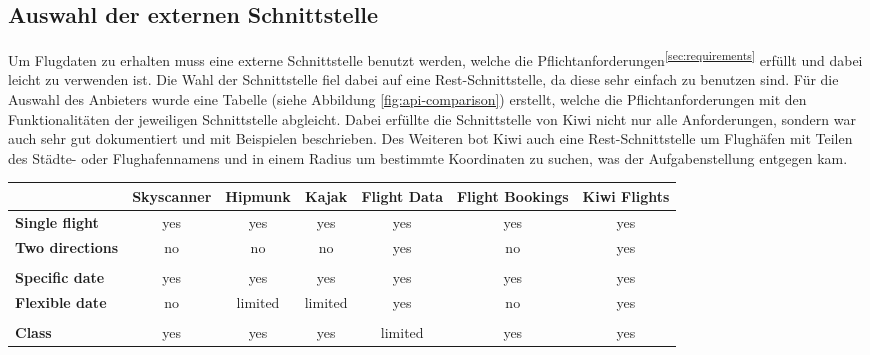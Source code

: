 \documentclass[12pt,twoside,a4paper]{article}
\begin{document}
\begin{sloppypar}
\subsection{Auswahl der externen Schnittstelle}
Um Flugdaten zu erhalten muss eine externe Schnittstelle benutzt werden, welche die Pflichtanforderungen\textsuperscript{\ref{sec:requirements}} erfüllt und dabei leicht zu verwenden ist. Die Wahl der Schnittstelle fiel dabei auf eine Rest-Schnittstelle, da diese sehr einfach zu benutzen sind. Für die Auswahl des Anbieters wurde eine Tabelle (siehe Abbildung \ref{fig:api-comparison}) erstellt, welche die Pflichtanforderungen mit den Funktionalitäten der jeweiligen Schnittstelle abgleicht. Dabei erfüllte die Schnittstelle von Kiwi nicht nur alle Anforderungen, sondern war auch sehr gut dokumentiert und mit Beispielen beschrieben. Des Weiteren bot Kiwi auch eine Rest-Schnittstelle um Flughäfen mit Teilen des Städte- oder Flughafennamens und in einem Radius um bestimmte Koordinaten zu suchen, was der Aufgabenstellung entgegen kam.
\begin{center}
	\captionsetup{type=figure}
	\resizebox{\textwidth}{!}
	{\begin{tabular}{ l | c | c | c | c | c | c }
			& \textbf{Skyscanner} & \textbf{Hipmunk} & \textbf{Kajak} & \textbf{Flight Data} & \textbf{Flight Bookings} & \textbf{Kiwi Flights}\\
			\hline
			\textbf{Single flight} & \cellcolor{green!50}yes & \cellcolor{green!50}yes & \cellcolor{green!50}yes & \cellcolor{green!50}yes & \cellcolor{green!50}yes & \cellcolor{green!50}yes\\
			\hline
			\textbf{Two directions} & \cellcolor{red!75}no & \cellcolor{red!75}no & \cellcolor{red!75}no & \cellcolor{green!50}yes & \cellcolor{red!75}no & \cellcolor{green!50}yes\\
			\hline
			& & & & & &\\
			\hline
			\textbf{Specific date} & \cellcolor{green!50}yes & \cellcolor{green!50}yes & \cellcolor{green!50}yes & \cellcolor{green!50}yes & \cellcolor{green!50}yes & \cellcolor{green!50}yes\\
			\hline
			\textbf{Flexible date} & \cellcolor{red!75}no & \cellcolor{yellow!75}limited & \cellcolor{yellow!75}limited & \cellcolor{green!50}yes & \cellcolor{red!75}no & \cellcolor{green!50}yes\\
			\hline
			& & & & & &\\
			\hline
			\textbf{Class} & \cellcolor{green!50}yes & \cellcolor{green!50}yes & \cellcolor{green!50}yes & \cellcolor{yellow!75}limited & \cellcolor{green!50}yes & \cellcolor{green!50}yes\\

\end{tabular}}
\end{center}
\end{sloppypar}
\end{document}
